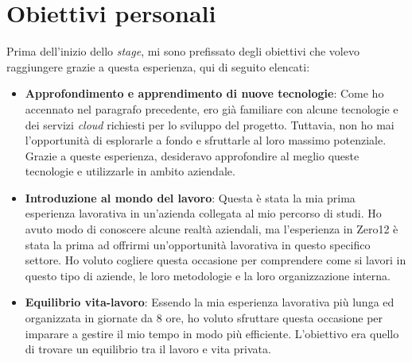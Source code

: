 \section{Obiettivi personali}
Prima dell'inizio dello \textit{stage}, mi sono prefissato degli obiettivi che volevo raggiungere grazie a questa esperienza, qui di seguito elencati:
\begin{itemize}
    \item \textbf{Approfondimento e apprendimento di nuove tecnologie}: Come ho accennato nel paragrafo precedente, ero già familiare con alcune tecnologie e dei servizi \textit{cloud} richiesti per lo sviluppo del progetto. Tuttavia, non ho mai l'opportunità di esplorarle a fondo e sfruttarle al loro massimo potenziale. Grazie a queste esperienza, desideravo approfondire al meglio queste tecnologie e utilizzarle in ambito aziendale.
    \item \textbf{Introduzione al mondo del lavoro}: Questa è stata la mia prima esperienza lavorativa in un'azienda collegata al mio percorso di studi. Ho avuto modo di conoscere alcune realtà aziendali, ma l'esperienza in Zero12 è stata la prima ad offrirmi un'opportunità lavorativa in questo specifico settore. Ho voluto cogliere questa occasione per comprendere come si lavori in questo tipo di aziende, le loro metodologie e la loro organizzazione interna. 
    \item \textbf{Equilibrio vita-lavoro}: Essendo la mia esperienza lavorativa più lunga ed organizzata in giornate da 8 ore, ho voluto sfruttare questa occasione per imparare a gestire il mio tempo in modo più efficiente. L'obiettivo era quello di trovare un equilibrio tra il lavoro e vita privata.
\end{itemize}